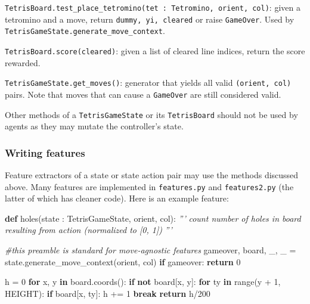 \documentclass[11pt]{article}
\newenvironment{Shaded}{}{}
\newcommand{\KeywordTok}[1]{\textcolor[rgb]{0.00,0.44,0.13}{\textbf{{#1}}}}
\newcommand{\DecValTok}[1]{\textcolor[rgb]{0.25,0.63,0.44}{{#1}}}
\newcommand{\CommentTok}[1]{\textcolor[rgb]{0.38,0.63,0.69}{\textit{{#1}}}}
\newcommand{\NormalTok}[1]{{#1}}
\newcommand{\ControlFlowTok}[1]{\textcolor[rgb]{0.00,0.44,0.13}{\textbf{{#1}}}}
\newcommand{\OperatorTok}[1]{\textcolor[rgb]{0.40,0.40,0.40}{{#1}}}
\newcommand{\BuiltInTok}[1]{{#1}}
\begin{document}
\texttt{TetrisBoard.test\_place\_tetromino(tet\ :\ Tetromino,\ orient,\ col)}:
given a tetromino and a move, return \texttt{dummy,\ yi,\ cleared} or
raise \texttt{GameOver}. Used by
\texttt{TetrisGameState.generate\_move\_context}.

\texttt{TetrisBoard.score(cleared)}: given a list of cleared line
indices, return the score rewarded.

\texttt{TetrisGameState.get\_moves()}: generator that yields all valid
\texttt{(orient,\ col)} pairs. Note that moves that can cause a
\texttt{GameOver} are still considered valid.

Other methods of a \texttt{TetrisGameState} or its \texttt{TetrisBoard}
should not be used by agents as they may mutate the controller's state.

\hypertarget{writing-features}{%
\subsubsection{Writing features}\label{writing-features}}

Feature extractors of a state or state action pair may use the methods
discussed above. Many features are implemented in \texttt{features.py}
and \texttt{features2.py} (the latter of which has cleaner code). Here
is an example feature:

\begin{Shaded}
\begin{Highlighting}[]
\KeywordTok{def}\NormalTok{ holes(state : TetrisGameState, orient, col):}
    \CommentTok{'''}
\CommentTok{    count number of holes in board resulting from action (normalized to [0, 1])}
\CommentTok{    '''}
    
    \CommentTok{#this preamble is standard for move-agnostic features}
\NormalTok{    gameover, board, _, _ }\OperatorTok{=}\NormalTok{ state.generate_move_context(orient, col)}
    \ControlFlowTok{if}\NormalTok{ gameover:}
        \ControlFlowTok{return} \DecValTok{0}

\NormalTok{    h }\OperatorTok{=} \DecValTok{0}
    \ControlFlowTok{for}\NormalTok{ x, y }\KeywordTok{in}\NormalTok{ board.coords():}
        \ControlFlowTok{if} \KeywordTok{not}\NormalTok{ board[x, y]:}
            \ControlFlowTok{for}\NormalTok{ ty }\KeywordTok{in} \BuiltInTok{range}\NormalTok{(y }\OperatorTok{+} \DecValTok{1}\NormalTok{, HEIGHT):}
                \ControlFlowTok{if}\NormalTok{ board[x, ty]:}
\NormalTok{                    h }\OperatorTok{+=} \DecValTok{1}
                    \ControlFlowTok{break}
    \ControlFlowTok{return}\NormalTok{ h}\OperatorTok{/}\DecValTok{200}
\end{Highlighting}
\end{Shaded}
\end{document}
